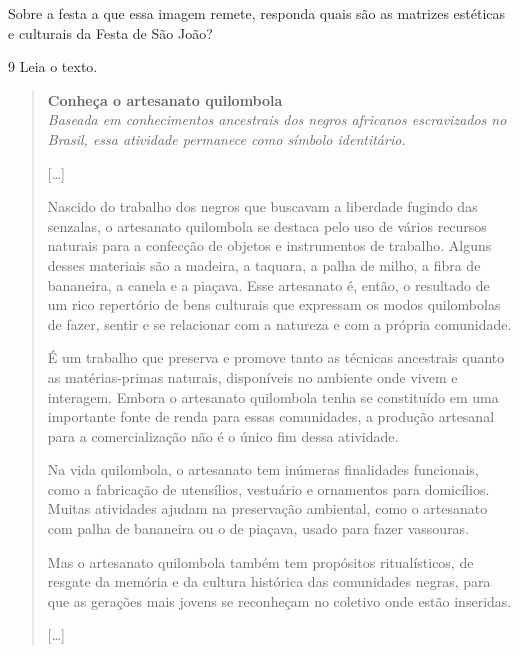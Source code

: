 Sobre a festa a que essa imagem remete, responda quais são as matrizes estéticas e culturais da Festa de São João?



\num{9} Leia o texto.

\begin{quote}
\textbf{Conheça o artesanato quilombola}\\
\textit{Baseada em conhecimentos ancestrais dos negros africanos escravizados no Brasil, essa atividade permanece como símbolo identitário.}

{[}\ldots{}{]}

Nascido do trabalho dos negros que buscavam a liberdade fugindo das
senzalas, o artesanato quilombola se destaca pelo uso de vários recursos
naturais para a confecção de objetos e instrumentos de trabalho. Alguns
desses materiais são a madeira, a taquara, a palha de milho, a fibra de
bananeira, a canela e a piaçava. Esse artesanato é, então, o resultado
de um rico repertório de bens culturais que expressam os modos
quilombolas de fazer, sentir e se relacionar com a natureza e com a
própria comunidade.

É um trabalho que preserva e promove tanto as técnicas ancestrais quanto
as matérias-primas naturais, disponíveis no ambiente onde vivem e
interagem. Embora o artesanato quilombola tenha se constituído em uma
importante fonte de renda para essas comunidades, a produção artesanal
para a comercialização não é o único fim dessa atividade.

Na vida quilombola, o artesanato tem inúmeras finalidades funcionais,
como a fabricação de utensílios, vestuário e ornamentos para domicílios.
Muitas atividades ajudam na preservação ambiental, como o artesanato com
palha de bananeira ou o de piaçava, usado para fazer vassouras.

Mas o artesanato quilombola também tem propósitos ritualísticos, de
resgate da memória e da cultura histórica das comunidades negras, para
que as gerações mais jovens se reconheçam no coletivo onde estão
inseridas.

{[}\ldots{}{]}

\end{quote}

